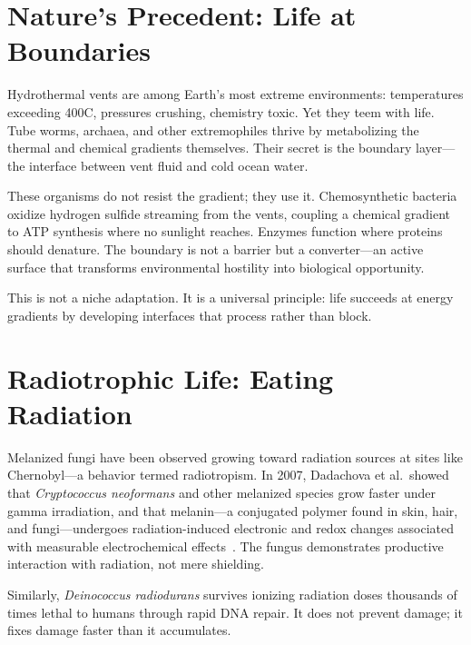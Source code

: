 \documentclass[12pt]{article}
\begin{document}
\section{Nature's Precedent: Life at Boundaries}

Hydrothermal vents are among Earth's most extreme environments: temperatures exceeding
400\textdegree C, pressures crushing, chemistry toxic. Yet they teem with life. Tube
worms, archaea, and other extremophiles thrive by metabolizing the thermal and chemical
gradients themselves. Their secret is the boundary layer---the interface between vent
fluid and cold ocean water.

These organisms do not resist the gradient; they use it. Chemosynthetic bacteria oxidize
hydrogen sulfide streaming from the vents, coupling a chemical gradient to ATP synthesis
where no sunlight reaches. Enzymes function where proteins should denature. The boundary
is not a barrier but a converter---an active surface that transforms environmental
hostility into biological opportunity.

This is not a niche adaptation. It is a universal principle: life succeeds at energy
gradients by developing interfaces that process rather than block.

\section{Radiotrophic Life: Eating Radiation}

Melanized fungi have been observed growing toward radiation sources at sites like
Chernobyl---a behavior termed radiotropism. In 2007, Dadachova et al.\ showed that
\textit{Cryptococcus neoformans} and other melanized species grow faster under gamma
irradiation, and that melanin---a conjugated polymer found in skin, hair, and
fungi---undergoes radiation-induced electronic and redox changes associated with
measurable electrochemical effects~\cite{dadachova2007,turick2011}. The fungus demonstrates productive interaction
with radiation, not mere shielding.

Similarly, \textit{Deinococcus radiodurans} survives ionizing radiation doses thousands
of times lethal to humans through rapid DNA repair. It does not prevent damage; it fixes
damage faster than it accumulates.
\end{document}
